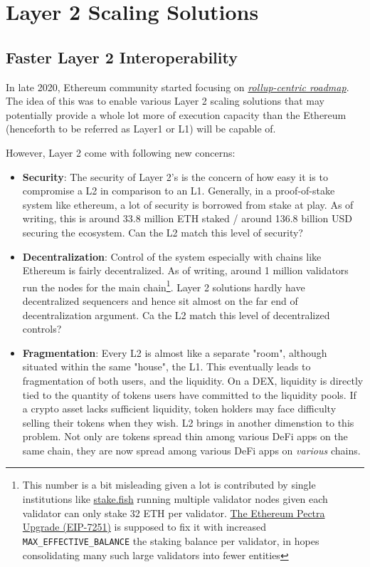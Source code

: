 
\chapter{Layer 2 Scaling Solutions}


\section{Faster Layer 2 Interoperability}
In late 2020, Ethereum community started focusing on \href{https://ethereum-magicians.org/t/a-rollup-centric-ethereum-roadmap/4698}{\emph{rollup-centric roadmap}}. The idea of this was to enable various Layer 2 scaling solutions that may potentially provide a whole lot more of execution capacity than the Ethereum (henceforth to be referred as Layer1 or L1) will be capable of. 

However, Layer 2 come with following new concerns:
\begin{itemize}
    \item \textbf{Security}: The security of Layer 2's is the concern of how easy it is to compromise a L2 in comparison to an L1. Generally, in a proof-of-stake system like ethereum, a lot of security is borrowed from stake at play. As of writing, this is around 33.8 million ETH staked / around 136.8 billion USD securing the ecosystem. Can the L2 match this level of security?
    \item \textbf{Decentralization}: Control of the system especially with chains like Ethereum is fairly decentralized. As of writing, around 1 million validators run the nodes for the main chain\footnote{This number is a bit misleading given a lot is contributed by single institutions like \href{stake.fish}{stake.fish} running multiple validator nodes given each validator can only stake 32 ETH per validator. \href{https://eips.ethereum.org/EIPS/eip-7251}{The Ethereum Pectra Upgrade (EIP-7251)} is supposed to fix it with increased \texttt{MAX\_EFFECTIVE\_BALANCE} the staking balance per validator, in hopes consolidating many such large validators into fewer entities}. Layer 2 solutions hardly have decentralized sequencers and hence sit almost on the far end of decentralization argument. Ca the L2 match this level of decentralized controls? 
    \item \textbf{Fragmentation}: Every L2 is almost like a separate "room", although situated within the same "house", the L1. This eventually leads to fragmentation of both users, and the liquidity. On a DEX, liquidity is directly tied to the quantity of tokens users have committed to the liquidity pools. If a crypto asset lacks sufficient liquidity, token holders may face difficulty selling their tokens when they wish. L2 brings in another dimenstion to this problem. Not only are tokens spread thin among various DeFi apps on the same chain, they are now spread among various DeFi apps on \emph{various} chains.
\end{itemize}

